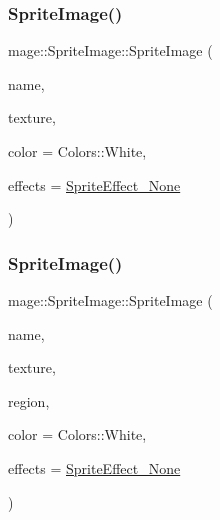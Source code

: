 \subsubsection{\texorpdfstring{Sprite\+Image()}{SpriteImage()}\hspace{0.1cm}{\footnotesize\ttfamily [1/4]}}
{\footnotesize\ttfamily mage\+::\+Sprite\+Image\+::\+Sprite\+Image (\begin{DoxyParamCaption}\item[{const string \&}]{name,  }\item[{\hyperlink{namespacemage_a1e01ae66713838a7a67d30e44c67703e}{Shared\+Ptr}$<$ \hyperlink{classmage_1_1_texture}{Texture} $>$}]{texture,  }\item[{const X\+M\+V\+E\+C\+T\+OR \&}]{color = {\ttfamily Colors\+:\+:White},  }\item[{\hyperlink{namespacemage_a9cfe18123066ba4236f548f9de75d881}{Sprite\+Effect}}]{effects = {\ttfamily \hyperlink{namespacemage_a9cfe18123066ba4236f548f9de75d881af3c275fbfacfe174da928b2f24dfa515}{Sprite\+Effect\+\_\+\+None}} }\end{DoxyParamCaption})\hspace{0.3cm}{\ttfamily [explicit]}}

\hypertarget{classmage_1_1_sprite_image_a189d4bc37642c13805f0efc1423d02c1}{}\label{classmage_1_1_sprite_image_a189d4bc37642c13805f0efc1423d02c1} 
\subsubsection{\texorpdfstring{Sprite\+Image()}{SpriteImage()}\hspace{0.1cm}{\footnotesize\ttfamily [2/4]}}
{\footnotesize\ttfamily mage\+::\+Sprite\+Image\+::\+Sprite\+Image (\begin{DoxyParamCaption}\item[{const string \&}]{name,  }\item[{\hyperlink{namespacemage_a1e01ae66713838a7a67d30e44c67703e}{Shared\+Ptr}$<$ \hyperlink{classmage_1_1_texture}{Texture} $>$}]{texture,  }\item[{const R\+E\+CT \&}]{region,  }\item[{const X\+M\+V\+E\+C\+T\+OR \&}]{color = {\ttfamily Colors\+:\+:White},  }\item[{\hyperlink{namespacemage_a9cfe18123066ba4236f548f9de75d881}{Sprite\+Effect}}]{effects = {\ttfamily \hyperlink{namespacemage_a9cfe18123066ba4236f548f9de75d881af3c275fbfacfe174da928b2f24dfa515}{Sprite\+Effect\+\_\+\+None}} }\end{DoxyParamCaption})\hspace{0.3cm}{\ttfamily [explicit]}}

